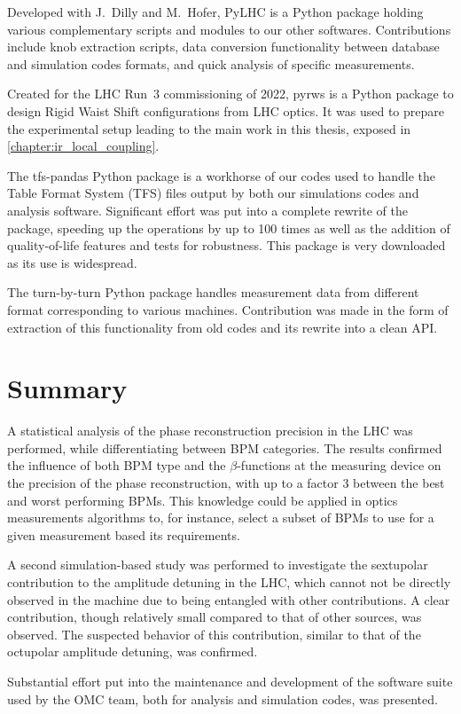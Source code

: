 Developed with J.~Dilly and M.~Hofer, PyLHC is a Python package holding various complementary scripts and modules to our other softwares.
Contributions include knob extraction scripts, data conversion functionality between database and simulation codes formats, and quick analysis of specific measurements.

Created for the LHC Run~\num{3} commissioning of \num{2022}, pyrws is a Python package to design Rigid Waist Shift configurations from LHC optics.
It was used to prepare the experimental setup leading to the main work in this thesis, exposed in \cref{chapter:ir_local_coupling}.

The tfs-pandas Python package is a workhorse of our codes used to handle the Table Format System (TFS) files output by both our simulations codes and analysis software.
Significant effort was put into a complete rewrite of the package, speeding up the operations by up to \num{100} times as well as the addition of quality-of-life features and tests for robustness.
This package is very downloaded as its use is widespread.

The turn-by-turn Python package handles measurement data from different format corresponding to various machines.
Contribution was made in the form of extraction of this functionality from old codes and its rewrite into a clean API.

\section{Summary}

A statistical analysis of the phase reconstruction precision in the LHC was performed, while differentiating between BPM categories.
The results confirmed the influence of both BPM type and the \(\beta\)-functions at the measuring device on the precision of the phase reconstruction, with up to a factor \num{3} between the best and worst performing BPMs.
This knowledge could be applied in optics measurements algorithms to, for instance, select a subset of BPMs to use for a given measurement based its requirements.

A second simulation-based study was performed to investigate the sextupolar contribution to the amplitude detuning in the LHC, which cannot not be directly observed in the machine due to being entangled with other contributions.
A clear contribution, though relatively small compared to that of other sources, was observed.
The suspected behavior of this contribution, similar to that of the octupolar amplitude detuning, was confirmed.

Substantial effort put into the maintenance and development of the software suite used by the OMC team, both for analysis and simulation codes, was presented.
